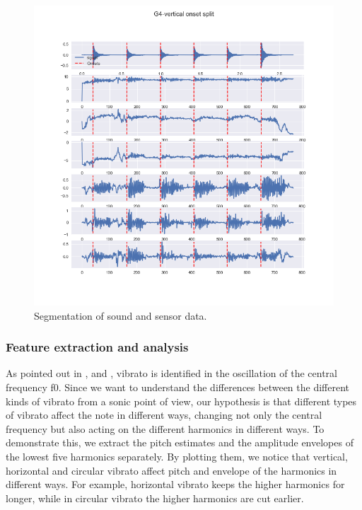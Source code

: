 \documentclass{nime-alternate} %
\begin{document}
\begin{figure}[htbp]
	\centering
		\includegraphics[width=1\columnwidth]{imgs/split.png}
	\caption{Segmentation of sound and sensor data.}
	\label{fig:segmentation}
\end{figure}

\subsubsection{Feature extraction and analysis}

As pointed out in \cite{jarvelainen_perception-based_nodate}, \cite{chen_electric_2015} and \cite{nishikawa_proficiency_2021}, vibrato is identified in the oscillation of the central frequency f0. Since we want to understand the differences between the different kinds of vibrato from a sonic point of view, our hypothesis is that different types of vibrato affect the note in different ways, changing not only the central frequency but also acting on the different harmonics in different ways. To demonstrate this, we extract the pitch estimates and the amplitude envelopes of the lowest five harmonics separately. By plotting them, we notice that vertical, horizontal and circular vibrato affect pitch and envelope of the harmonics in different ways. 
For example, horizontal vibrato keeps the higher harmonics for longer, while in circular vibrato the higher harmonics are cut earlier.  
\end{document}
